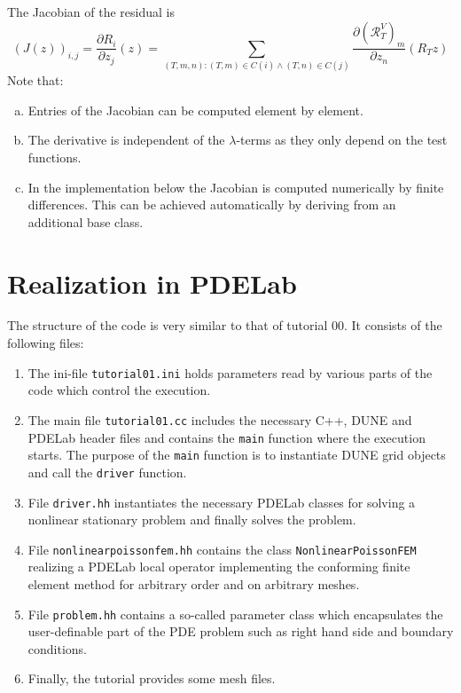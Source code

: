 \documentclass[a4paper,12pt]{article}
\begin{document}
The Jacobian of the residual is
\begin{equation*}
(J(z))_{i,j} = \frac{\partial R_i}{\partial z_j} (z) =
\sum_{(T,m,n) : (T,m)\in C(i) \wedge (T,n)\in C(j)} \frac{\partial (\mathcal{R}_T^V)_m}{\partial z_n}
(R_T z)
\end{equation*}
Note that:
\begin{enumerate}[a)]
\item Entries of the Jacobian can be computed element by element.
\item The derivative is independent of the $\lambda$-terms as
they only depend on the test functions.
\item In the implementation below the Jacobian is computed numerically
by finite differences. This can be achieved automatically by deriving from an
additional base class.
\end{enumerate}

\section{Realization in PDELab}

The structure of the code is very similar to that of tutorial 00. It consists of the following
files:
\begin{enumerate}[1)]
\item The ini-file
\lstinline{tutorial01.ini} holds parameters read by various parts of the code
which control the execution. 
\item The main file \lstinline{tutorial01.cc} includes the necessary C++,
DUNE and PDELab header files
and contains the \lstinline{main} function where the execution starts. 
The purpose of the \lstinline{main} function is
to instantiate DUNE grid objects and call the \lstinline{driver} function.
\item File \lstinline{driver.hh} instantiates the necessary PDELab classes 
for solving a nonlinear stationary problem and finally solves the problem.
\item File \lstinline{nonlinearpoissonfem.hh} contains the class
\lstinline{NonlinearPoissonFEM} realizing a PDELab local operator implementing
the conforming finite element method for arbitrary order and on arbitrary meshes.
\item File \lstinline{problem.hh} contains a so-called parameter class which
encapsulates the user-definable part of the PDE problem such as right hand
side and boundary conditions.
\item Finally, the tutorial provides some mesh files.
\end{enumerate}
\end{document}
